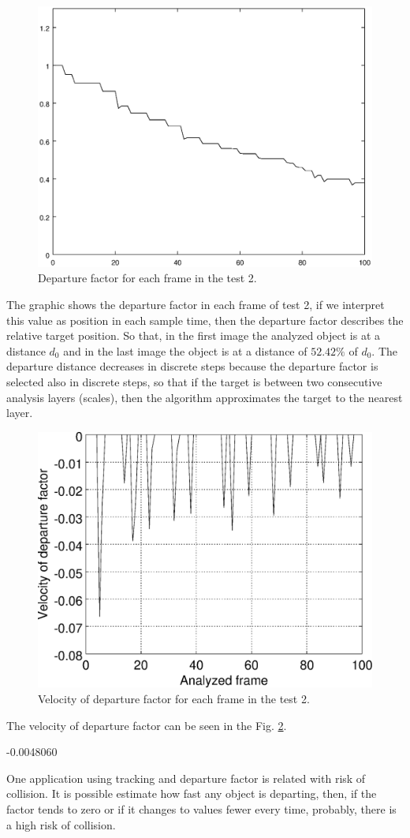 \begin{figure}[!hbt]
\includegraphics[width=\columnwidth]{images/graph2.eps}
\caption{Departure factor for each frame in the test 2.}
\label{fig:res_graph2}
\end{figure}
The graphic shows the departure factor in each frame
of test 2, if we interpret this value as position in each sample time, 
then the departure factor describes the relative target position.
So that, in the first image the analyzed object is at a distance $d_0$ 
and in the last image the object is at a distance of $52.42\%$ of $d_0$.
The departure distance decreases in discrete steps because the departure
factor is selected also in discrete steps, so that if the target is
between two consecutive analysis layers (scales), then the algorithm
approximates the target to the nearest layer. 
\begin{figure}[!hbt]
\includegraphics[width=\columnwidth]{images/graph2v.eps}
\caption{Velocity of departure factor for each frame in the test 2.}
\label{fig:res_graph2v}
\end{figure}
The velocity of departure factor can be seen in the Fig. \ref{fig:res_graph2v}.

-0.0048060


One application using tracking and departure factor is 
related with risk of collision. 
It is possible estimate how fast any object is departing,
then, if the factor tends to zero or if it changes to values 
fewer every time, probably, there is a high risk of collision.



